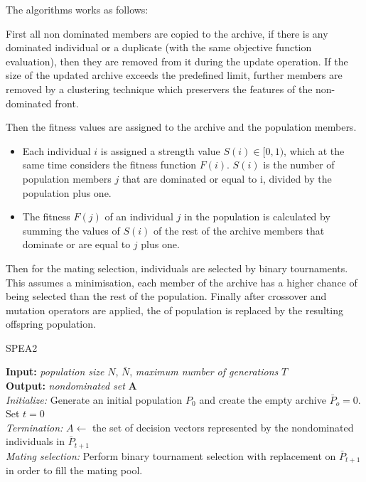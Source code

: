 The algorithms works as follows:

First all non dominated members are copied to the archive, if there is any dominated individual or a duplicate (with the same objective function evaluation), then they are removed from it during the update operation. If the size of the updated archive exceeds the predefined limit, further members are removed by a clustering technique which preservers the features of the non-dominated front. 

Then the fitness values are assigned to the archive and the population members. 
\begin{itemize}
    \item Each individual $i$ is assigned a strength value $S(i) \in [0, 1)$, which  at the same time considers the fitness function $F(i)$. $S(i)$ is the number of population members $j$ that are dominated or equal to i, divided by the population plus one.
    \item The fitness $F(j)$ of an individual $j$ in the population is calculated by summing the values of $S(i)$ of the rest of the archive members that dominate or are equal to $j$ plus one.
\end{itemize}

Then for the mating selection, individuals are selected by binary tournaments. This assumes a minimisation, each member of the archive has a higher chance of being selected than the rest of the population. Finally after crossover and mutation operators are applied, the of population is replaced by the resulting offspring population.

\begin{algorithm}[H]
\label{spea2_alg}
\caption{SPEA2}
\SetAlgoLined
\textbf{Input:} \textit{population size} $N$,  $\bar N$, \textit{maximum number of generations} $T$\;\\
\textbf{Output:} \textit{nondominated set} \textbf{A}\;\\
\textit{Initialize:} Generate an initial population $P_0$ and create the empty archive $\bar P_o = 0.$ Set $t = 0$\;\\
\textit{Termination:} $A \gets$ the set of decision vectors represented by the nondominated individuals in $\bar P_{t+1}$\;\\
\textit{Mating selection:} Perform binary tournament selection with replacement on $\bar P_{t+1}$ in order to fill the mating pool.
\end{algorithm}

